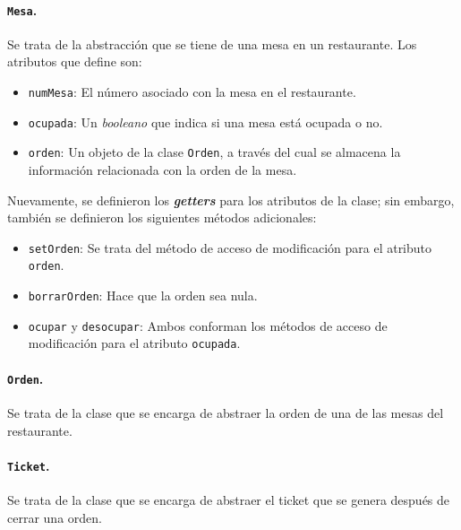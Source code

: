 \paragraph{\texttt{Mesa}.} Se trata de la abstracción que se tiene de una mesa en 
un restaurante. Los atributos que define son:
\begin{itemize}
  \item \texttt{numMesa}: El número asociado con la mesa en el restaurante.
  \item  \texttt{ocupada}: Un \textit{booleano} que indica si una mesa está ocupada
    o no.
  \item \texttt{orden}: Un objeto de la clase \texttt{Orden}, a través del cual se 
    almacena la información relacionada con la orden de la mesa.
\end{itemize}

Nuevamente, se definieron los \textit{\textbf{getters}} para los atributos de la 
clase; sin embargo, también se definieron los siguientes métodos adicionales:
\begin{itemize}
  \item \texttt{setOrden}: Se trata del método de acceso de modificación para el 
    atributo \texttt{orden}.
  \item \texttt{borrarOrden}: Hace que la orden sea nula.
  \item \texttt{ocupar} y \texttt{desocupar}: Ambos conforman los métodos de acceso 
    de modificación para el atributo \texttt{ocupada}.
\end{itemize}

\paragraph{\texttt{Orden}.} Se trata de la clase que se encarga de abstraer la orden 
de una de las mesas del restaurante.

\paragraph{\texttt{Ticket}.} Se trata de la clase que se encarga de abstraer el 
ticket que se genera después de cerrar una orden.

\pagebreak

